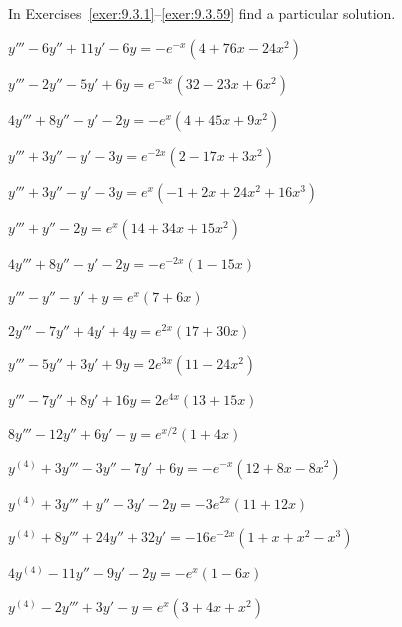 \exercises In Exercises~\ref{exer:9.3.1}--\ref{exer:9.3.59} find a particular solution.

\begin{exerciselist}
  \item\label{exer:9.3.1} $y'''-6y''+11y'-6y=-e^{-x}(4+76x-24x^{2})$

  \item\label{exer:9.3.2} $y'''-2y''-5y'+6y=e^{-3x}(32-23x+6x^{2})$

  \item\label{exer:9.3.3} $4y'''+8y''-y'-2y=-e^{x}(4+45x+9x^{2})$

  \item\label{exer:9.3.4} $y'''+3y''-y'-3y=e^{-2x}(2-17x+3x^{2})$

  \item\label{exer:9.3.5} $y'''+3y''-y'-3y=e^{x}(-1+2x+24x^{2}+16x^{3})$

  \item\label{exer:9.3.6} $y'''+y''-2y=e^{x}(14+34x+15x^{2})$

  \item\label{exer:9.3.7} $4y'''+8y''-y'-2y=-e^{-2x}(1-15x)$

  \item\label{exer:9.3.8} $y'''-y''-y'+y=e^{x}(7+6x)$

  \item\label{exer:9.3.9} $2y'''-7y''+4y'+4y=e^{2x}(17+30x)$

  \item\label{exer:9.3.10} $y'''-5y''+3y'+9y=2e^{3x}(11-24x^{2})$

  \item\label{exer:9.3.11} $y'''-7y''+8y'+16y=2e^{4x}(13+15x)$

  \item\label{exer:9.3.12} $8y'''-12y''+6y'-y=e^{x/2}(1+4x)$

  \item\label{exer:9.3.13} $y^{(4)}+3y'''-3y''-7y'+6y=-e^{-x}(12+8x-8x^{2})$

  \item\label{exer:9.3.14} $y^{(4)}+3y'''+y''-3y'-2y=-3e^{2x}(11+12x)$

  \item\label{exer:9.3.15} $y^{(4)}+8y'''+24y''+32y'=-16e^{-2x}(1+x+x^{2}-x^{3})$

  \item\label{exer:9.3.16} $4y^{(4)}-11y''-9y'-2y=-e^{x}(1-6x)$

  \item\label{exer:9.3.17} $y^{(4)}-2y'''+3y'-y=e^{x}(3+4x+x^{2})$


\end{exerciselist}
